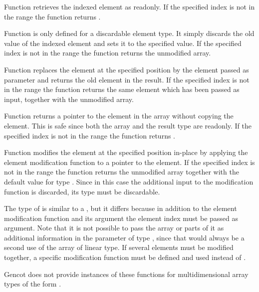 Function  retrieves the indexed element as readonly. If the specified index 
is not in the range  the function returns .

Function  is only defined for a discardable element type. 
It simply discards the old value of the indexed element and sets it to the specified value.
If the specified index is not in the range  the function returns the unmodified array.

Function 
replaces the element at the specified position by the element passed as parameter and returns the old element in the result.
If the specified
index is not in the range  the function returns the same element which has been
passed as input, together with the unmodified array. 

Function  returns a pointer to the element in the array without copying the element. This is safe since 
both the array and the result
type are readonly. If the specified index is not in the range  the function returns . 

Function  modifies the element at the specified position in-place by applying the element modification function
to a pointer to the element. 
If the specified
index is not in the range  the function returns the unmodified array together with the default value
 for type . Since in this case the 
additional input to the modification function is discarded, its type  must be discardable.

The type of  is similar to a , but it differs because in addition to the element modification 
function and its argument the element index must be passed as argument.
Note that it is not possible
to pass the array or parts of it as additional information in the parameter of type , since that would always be
a second use of the array of linear type. If several elements must be modified together, a specific modification function
must be defined and used instead of .

Gencot does not provide instances of these functions for multidimensional array types of the form .


